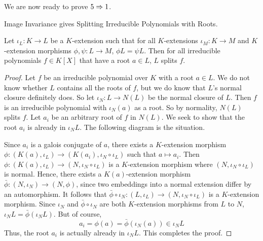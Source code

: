 \documentclass[../book.tex]{subfiles}
\begin{document}
We are now ready to prove $5 \Rightarrow 1$. 
\begin{thm} Image Invariance gives Splitting Irreducible Polynomials with Roots.
    
    Let $\iota_L : K \to L$ be a $K$-extension such that
    for all $K$-extensions $\iota_M : K \to M$ and 
    $K$-extension morphisms $\phi, \psi : L \to M$, $\phi L = \psi L$. 
    Then for all irreducible polynomials $f \in K[X]$ that have a root $a \in L$, 
    $L$ splits $f$. 
\end{thm}
\begin{proof}
    Let $f$ be an irreducible polynomial over $K$ with a root $a \in L$. 
    We do not know whether $L$ contains all the roots of $f$, 
    but we do know that $L$'s normal closure definitely does. 
    So let $\iota_N : L \to N(L)$ be the normal closure of $L$. 
    Then $f$ is an irreducible polynomial with $\iota_N(a)$ as a root.
    So by normality, $N(L)$ splits $f$. 
    Let $a_i$ be an arbitrary root of $f$ in $N(L)$. 
    We seek to show that the root $a_i$ is already in $\iota_N L$. 
    The following diagram is the situation. 
    \begin{figure} [H]
        \centering
    \end{figure}
    Since $a_i$ is a galois conjugate of $a$, 
    there exists a $K$-extension morphism 
    $\phi : (K(a),\iota_L) \to (K(a_i),\iota_N\circ\iota_L)$ 
    such that $a \mapsto a_i$. 
    Then $\phi : (K(a),\iota_L) \to (N,\iota_N\circ\iota_L)$
    is a $K$-extension morphism where $(N,\iota_N\circ\iota_L)$ is normal. 
    Hence, there exists a $K(a)$-extension morphism 
    $\bar\phi : (N,\iota_N) \to (N,\phi)$,
    since two embeddings into a normal extension differ by an automorphism. 
    It follows that 
    $\bar\phi\circ\iota_N : (L,\iota_L) \to (N,\iota_N\circ\iota_L)$
    is a $K$-extension morphism. 
    Since $\iota_N$ and $\bar\phi\circ\iota_N$ are 
    both $K$-extension morphisms from $L$ to $N$,
    $\iota_N L = \bar\phi(\iota_N L)$.
    But of course, 
    \[ a_i = \phi(a) = \bar\phi(\iota_N(a)) \in \iota_N L\]
    Thus, the root $a_i$ is actually already in $\iota_N L$.
    This completes the proof. 
\end{proof}
\end{document}
